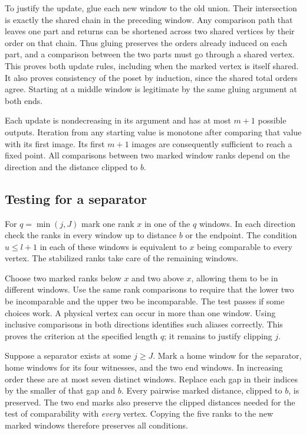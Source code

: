 \documentclass[11pt]{article}
\begin{document}
To justify the update, glue each new window to the old union. Their intersection is exactly the shared chain in the preceding window. Any comparison path that leaves one part and returns can be shortened across two shared vertices by their order on that chain. Thus gluing preserves the orders already induced on each part, and a comparison between the two parts must go through a shared vertex. This proves both update rules, including when the marked vertex is itself shared. It also proves consistency of the poset by induction, since the shared total orders agree. Starting at a middle window is legitimate by the same gluing argument at both ends.

Each update is nondecreasing in its argument and has at most $m+1$ possible outputs. Iteration from any starting value is monotone after comparing that value with its first image. Its first $m+1$ images are consequently sufficient to reach a fixed point. All comparisons between two marked window ranks depend on the direction and the distance clipped to $b$.

\subsection*{Testing for a separator}
For $q=\min(j,J)$ mark one rank $x$ in one of the $q$ windows. In each direction check the ranks in every window up to distance $b$ or the endpoint. The condition $u\le l+1$ in each of these windows is equivalent to $x$ being comparable to every vertex. The stabilized ranks take care of the remaining windows.

Choose two marked ranks below $x$ and two above $x$, allowing them to be in different windows. Use the same rank comparisons to require that the lower two be incomparable and the upper two be incomparable. The test passes if some choices work. A physical vertex can occur in more than one window. Using inclusive comparisons in both directions identifies such aliases correctly. This proves the criterion at the specified length $q$; it remains to justify clipping $j$.

Suppose a separator exists at some $j\ge J$. Mark a home window for the separator, home windows for its four witnesses, and the two end windows. In increasing order these are at most seven distinct windows. Replace each gap in their indices by the smaller of that gap and $b$. Every pairwise marked distance, clipped to $b$, is preserved. The two end marks also preserve the clipped distances needed for the test of comparability with \emph{every} vertex. Copying the five ranks to the new marked windows therefore preserves all conditions.
\end{document}
